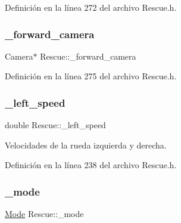 Definición en la línea 272 del archivo Rescue.\+h.

\mbox{\label{classRescue_a8cc51f98f8203494918ca1d313fca408_a8cc51f98f8203494918ca1d313fca408}} 
\subsubsection{\texorpdfstring{\+\_\+forward\+\_\+camera}{\_forward\_camera}}
{\footnotesize\ttfamily Camera$\ast$ Rescue\+::\+\_\+forward\+\_\+camera\hspace{0.3cm}{\ttfamily [private]}}



Definición en la línea 275 del archivo Rescue.\+h.

\mbox{\label{classRescue_a29d594459f17968e6db993605d239c47_a29d594459f17968e6db993605d239c47}} 
\subsubsection{\texorpdfstring{\+\_\+left\+\_\+speed}{\_left\_speed}}
{\footnotesize\ttfamily double Rescue\+::\+\_\+left\+\_\+speed\hspace{0.3cm}{\ttfamily [private]}}



Velocidades de la rueda izquierda y derecha. 



Definición en la línea 238 del archivo Rescue.\+h.

\mbox{\label{classRescue_a70a5e292c84029568ff6c0de2f2d9f43_a70a5e292c84029568ff6c0de2f2d9f43}} 
\subsubsection{\texorpdfstring{\+\_\+mode}{\_mode}}
{\footnotesize\ttfamily \hyperlink{classRescue_ab44ced9ce57b1b0d19b5456cd952d702_ab44ced9ce57b1b0d19b5456cd952d702}{Mode} Rescue\+::\+\_\+mode\hspace{0.3cm}{\ttfamily [private]}}



